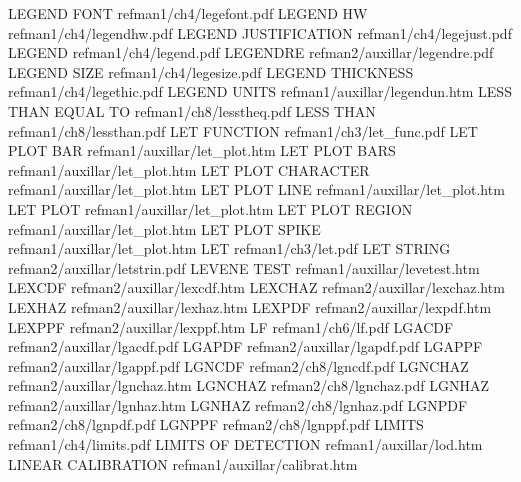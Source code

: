 LEGEND FONT                             refman1/ch4/legefont.pdf
LEGEND HW                               refman1/ch4/legendhw.pdf
LEGEND JUSTIFICATION                    refman1/ch4/legejust.pdf
LEGEND                                  refman1/ch4/legend.pdf
LEGENDRE                                refman2/auxillar/legendre.pdf
LEGEND SIZE                             refman1/ch4/legesize.pdf
LEGEND THICKNESS                        refman1/ch4/legethic.pdf
LEGEND UNITS                            refman1/auxillar/legendun.htm
LESS THAN EQUAL TO                      refman1/ch8/lesstheq.pdf
LESS THAN                               refman1/ch8/lessthan.pdf
LET FUNCTION                            refman1/ch3/let_func.pdf
LET PLOT BAR                            refman1/auxillar/let_plot.htm
LET PLOT BARS                           refman1/auxillar/let_plot.htm
LET PLOT CHARACTER                      refman1/auxillar/let_plot.htm
LET PLOT LINE                           refman1/auxillar/let_plot.htm
LET PLOT                                refman1/auxillar/let_plot.htm
LET PLOT REGION                         refman1/auxillar/let_plot.htm
LET PLOT SPIKE                          refman1/auxillar/let_plot.htm
LET                                     refman1/ch3/let.pdf
LET STRING                              refman2/auxillar/letstrin.pdf
LEVENE TEST                             refman1/auxillar/levetest.htm
LEXCDF                                  refman2/auxillar/lexcdf.htm
LEXCHAZ                                 refman2/auxillar/lexchaz.htm
LEXHAZ                                  refman2/auxillar/lexhaz.htm
LEXPDF                                  refman2/auxillar/lexpdf.htm
LEXPPF                                  refman2/auxillar/lexppf.htm
LF                                      refman1/ch6/lf.pdf
LGACDF                                  refman2/auxillar/lgacdf.pdf
LGAPDF                                  refman2/auxillar/lgapdf.pdf
LGAPPF                                  refman2/auxillar/lgappf.pdf
LGNCDF                                  refman2/ch8/lgncdf.pdf
LGNCHAZ                                 refman2/auxillar/lgnchaz.htm
LGNCHAZ                                 refman2/ch8/lgnchaz.pdf
LGNHAZ                                  refman2/auxillar/lgnhaz.htm
LGNHAZ                                  refman2/ch8/lgnhaz.pdf
LGNPDF                                  refman2/ch8/lgnpdf.pdf
LGNPPF                                  refman2/ch8/lgnppf.pdf
LIMITS                                  refman1/ch4/limits.pdf
LIMITS OF DETECTION                     refman1/auxillar/lod.htm
LINEAR CALIBRATION                      refman1/auxillar/calibrat.htm
